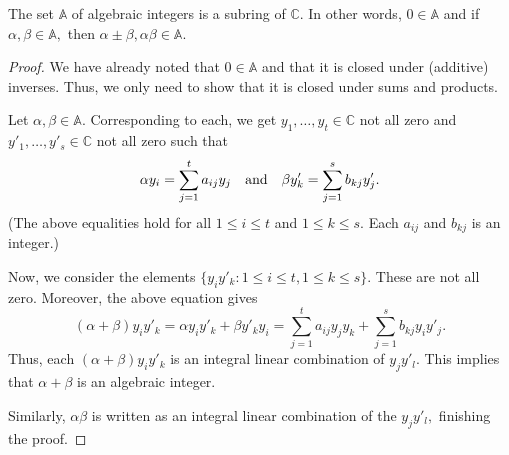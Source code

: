 \begin{prop} \label{prop:algintsubring}
	The set $\mathbb{A}$ of algebraic integers is a subring of $\mathbb{C}.$ In other words, $0 \in \mathbb{A}$ and if $\alpha, \beta \in \mathbb{A},$ then $\alpha \pm \beta, \alpha\beta \in \mathbb{A}.$
\end{prop}
\begin{proof} 
	We have already noted that $0 \in \mathbb{A}$ and that it is closed under (additive) inverses. Thus, we only need to show that it is closed under sums and products.

	Let $\alpha, \beta \in \mathbb{A}.$ Corresponding to each, we get $y_1, \ldots, y_t \in \mathbb{C}$ not all zero and $y'_1, \ldots, y'_s \in \mathbb{C}$ not all zero such that
	\begin{equation*} 
		\alpha y_i = \sum_{j = 1}^{t}a_{ij}y_j \quad\text{and}\quad \beta y'_k = \sum_{j = 1}^{s}b_{kj}y'_j.
	\end{equation*}
	(The above equalities hold for all $1 \le i \le t$ and $1 \le k \le s.$ Each $a_{ij}$ and $b_{kj}$ is an integer.) 

	Now, we consider the elements $\{y_iy'_k : 1 \le i \le t, 1 \le k \le s\}.$ These are not all zero. Moreover, the above equation gives
	\begin{equation*} 
		(\alpha + \beta)y_iy'_k = \alpha y_iy'_k + \beta y'_ky_i = \sum_{j = 1}^{t}a_{ij}y_jy_k + \sum_{j = 1}^{s}b_{kj}y_iy'_j.
	\end{equation*}
	Thus, each $(\alpha + \beta)y_iy'_k$ is an integral linear combination of $y_jy'_l.$ This implies that $\alpha + \beta$ is an algebraic integer.

	Similarly, $\alpha\beta$ is written as an integral linear combination of the $y_jy'_l,$ finishing the proof.
\end{proof}
